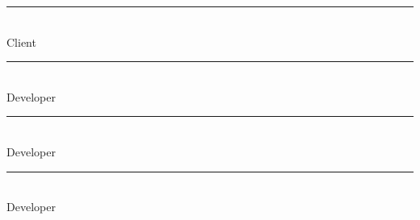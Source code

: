 \documentclass[letterpaper, 10pt,titlepage]{article}
\begin{document}
\newpage
\textbf{ }
\vspace{5.0cm}

\noindent\rule{13cm}{0.4pt}\\
Client
\vspace{3.0cm}

\noindent\rule{13cm}{0.4pt}\\
Developer
\vspace{3.0cm}


\noindent\rule{13cm}{0.4pt}\\
Developer
\vspace{3.0cm}


\noindent\rule{13cm}{0.4pt}\\
Developer
\vspace{3.0cm}
\end{document}
